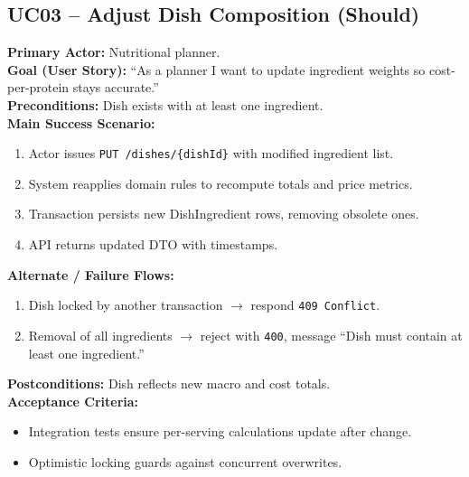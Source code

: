 \documentclass[11pt]{article}
\begin{document}
\subsection*{UC03 -- Adjust Dish Composition (Should)}
\textbf{Primary Actor:} Nutritional planner.\\
\textbf{Goal (User Story):} ``As a planner I want to update ingredient weights so cost-per-protein stays accurate.''\\
\textbf{Preconditions:} Dish exists with at least one ingredient.\\
\textbf{Main Success Scenario:}
\begin{enumerate}[label=\arabic*.]
  \item Actor issues \texttt{PUT /dishes/\{dishId\}} with modified ingredient list.
  \item System reapplies domain rules to recompute totals and price metrics.
  \item Transaction persists new DishIngredient rows, removing obsolete ones.
  \item API returns updated DTO with timestamps.
\end{enumerate}
\textbf{Alternate / Failure Flows:}
\begin{enumerate}[label=\arabic*F.]
  \item Dish locked by another transaction $\rightarrow$ respond \texttt{409 Conflict}.
  \item Removal of all ingredients $\rightarrow$ reject with \texttt{400}, message ``Dish must contain at least one ingredient.''
\end{enumerate}
\textbf{Postconditions:} Dish reflects new macro and cost totals.\\
\textbf{Acceptance Criteria:}
\begin{itemize}[noitemsep]
  \item Integration tests ensure per-serving calculations update after change.
  \item Optimistic locking guards against concurrent overwrites.
\end{itemize}
\end{document}
